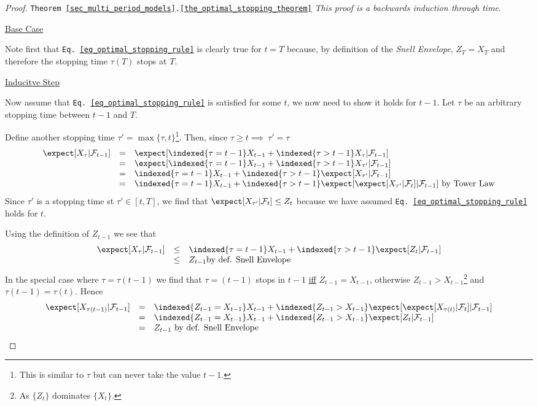 \documentclass[11pt,a4paper]{article}
\begin{document}
  \begin{proof}{\texttt{Theorem \ref{sec_multi_period_models}.\ref{the_optimal_stopping_theorem}}}
    \textit{This proof is a backwards induction through time}.
    \par \underline{Base Case}
    \par Note first that  \texttt{Eq. \ref{eq_optimal_stopping_rule}} is clearly true for $t=T$ because, by definition of the \textit{Snell Envelope}, $Z_T=X_T$ and therefore the stopping time $\tau(T)$ stops at $T$.
    \par \underline{Inducitve Step}
    \par Now assume that \texttt{Eq. \ref{eq_optimal_stopping_rule}} is satisfied for some $t$, we now need to show it holds for $t-1$. Let $\tau$ be an arbitrary stopping time between $t-1$ and $T$.
    \par Define another stopping time $\tau'=\max\{\tau,t\}$\footnote{This is similar to $\tau$ but can never take the value $t-1$.}. Then, since $\tau\geq t\implies\ \tau'=\tau$
    \[\begin{array}{rcl}
      \expect[X_\tau|\mathcal{F}_{t-1}]&=&\expect[\indexed\{\tau=t-1\}X_{t-1}+\indexed\{\tau>t-1\}X_\tau|\mathcal{F}_{t-1}]\\
      &=&\expect[\indexed\{\tau=t-1\}X_{t-1}+\indexed\{\tau>t-1\}X_{\tau'}|\mathcal{F}_{t-1}]\\
      &=&\indexed\{\tau=t-1\}X_{t-1}+\indexed\{\tau>t-1\}\expect[X_{\tau'}|\mathcal{F}_{t-1}]\\
      &=&\indexed\{\tau=t-1\}X_{t-1}+\indexed\{\tau>t-1\}\expect[\expect[X_{\tau'}|\mathcal{F}_t]|\mathcal{F}_{t-1}]\text{ by Tower Law}
    \end{array}\]
    Since $\tau'$ is a stopping time st $\tau'\in[t,T]$, we find that $\expect[X_{\tau'}|\mathcal{F}_t]\leq Z_t$ because we have assumed \texttt{Eq. \ref{eq_optimal_stopping_rule}} holds for $t$.
    \par Using the definition of $Z_{t-1}$ we see that
    \[\begin{array}{rcl}
      \expect[X_\tau|\mathcal{F}_{t-1}]&\leq&\indexed\{\tau=t-1\}X_{t-1}+\indexed\{\tau>t-1\}\expect[Z_t|\mathcal{F}_{t-1}]\\
      &\leq&Z_{t-1}\text{by def. Snell Envelope}
    \end{array}\]
    In the special case where $\tau=\tau(t-1)$ we find that $\tau=(t-1)$ stops in $t-1$ \underline{iff} $Z_{t-1}=X_{t-1}$, otherwise $Z_{t-1}>X_{t-1}$\footnote{As $\{Z_t\}$ dominates $\{X_t\}$.} and $\tau(t-1)=\tau(t)$. Hence
    \[\begin{array}{rcl}
      \expect[X_{\tau(t-1)}|\mathcal{F}_{t-1}]&=&\indexed\{Z_{t-1}=X_{t-1}\}X_{t-1}+\indexed\{Z_{t-1}>X_{t-1}\}\expect[\expect[X_{\tau(t)}|\mathcal{F}_t]|\mathcal{F}_{t-1}]\\
      &=&\indexed\{Z_{t-1}=X_{t-1}\}X_{t-1}+\indexed\{Z_{t-1}>X_{t-1}\}\expect[Z_t|\mathcal{F}_{t-1}]\\
      &=&Z_{t-1}\text{ by def. Snell Envelope}
    \end{array}\]
  \end{proof}
\end{document}
